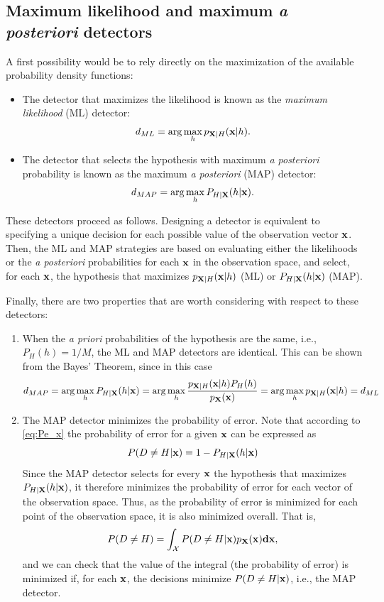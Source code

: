 \subsection{Maximum likelihood and maximum \emph{a posteriori} detectors}

A first possibility would be to rely directly on the maximization of the available probability density functions:

\begin{itemize}
    \item The detector that maximizes the likelihood is known as the {\em maximum likelihood} (ML) detector:
    $$d_{ML} = \arg\max_h p_{{\bf X}|H}({\bf x}|h).$$
    \item The detector that selects the hypothesis with maximum {\em a posteriori} probability is known as the  maximum {\em a posteriori} (MAP) detector:
    $$d_{MAP} = \arg\max_h P_{H|{\bf X}}(h|{\bf x}).$$
\end{itemize}

These detectors proceed as follows. Designing a detector is equivalent to specifying a unique decision for each possible value of the observation vector ${\bf x}$. Then, the ML and MAP strategies are based on evaluating either the likelihoods or the {\em a posteriori} probabilities for each ${\bf x}$ in the observation space, and select, for each ${\bf x}$, the hypothesis that maximizes $p_{{\bf X}|H}({\bf x}|h)$ (ML) or $P_{H|{\bf X}}(h|{\bf x})$ (MAP).

Finally, there are two properties that are worth considering with respect to these detectors:
\begin{enumerate}
    \item When the {\em a priori} probabilities of the hypothesis are the same, i.e., $P_H(h) = 1/M$, the ML and MAP detectors are identical. This can be shown from the Bayes' Theorem, since in this case
    $$d_{MAP} = \arg\max_h P_{H|{\bf X}}(h|{\bf x}) = \arg\max_h \frac{p_{{\bf X}|H}({\bf x}|h) P_H(h)}{p_{\bf X}(\bf x)} = \arg\max_h p_{{\bf X}|H}({\bf x}|h) = d_{ML}$$
    
    \item The MAP detector minimizes the probability of error. Note that according to \eqref{eq:Pe_x} the probability of error for a given $\bf x$ can be expressed as
    $$P(D\neq H|{\bf x}) = 1 - P_{ H|{\bf X}}(h|{\bf x})$$
    Since the MAP detector selects for every $\bf x$ the hypothesis that maximizes $P_{H|{\bf X}}(h|{\bf x})$, it therefore minimizes the probability of error for each vector of the observation space. Thus, as the probability of error is minimized for each point of the observation space, it is also minimized overall. That is,
    $$P(D\neq H) = \int_{\mathcal{X}} P(D\neq H|{\bf x}) p_{\bf X}(\bf x) d{\bf x},$$
    and we can check that the value of the integral (the probability of error) is minimized if, for each $\bf x$, the decisions minimize $P(D\neq H|{\bf x})$, i.e., the MAP detector.
    
\end{enumerate}

